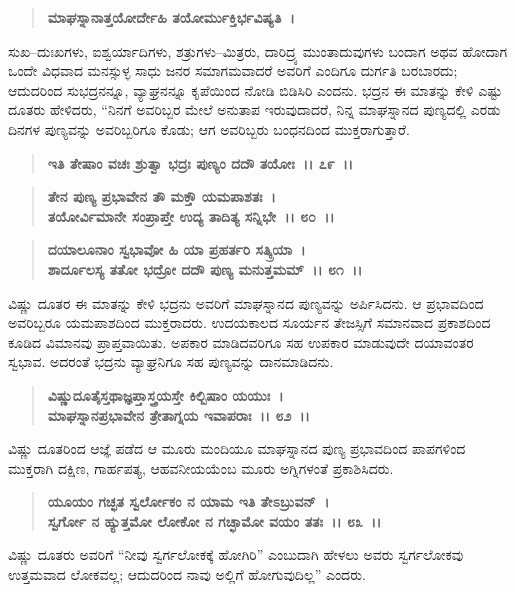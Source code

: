 \begin{verse}
\textbf{ಮಾಘಸ್ನಾನಾತ್ತಯೋರ್ದೇಹಿ ತಯೋರ್ಮುಕ್ತಿರ್ಭವಿಷ್ಯತಿ~।}
\end{verse}

ಸುಖ–ದುಃಖಗಳು, ಐಶ್ವರ್ಯಾದಿಗಳು, ಶತ್ರುಗಳು–ಮಿತ್ರರು, ದಾರಿದ್ರ್ಯ ಮುಂತಾದುವುಗಳು ಬಂದಾಗ ಅಥವ ಹೋದಾಗ ಒಂದೇ ವಿಧವಾದ ಮನಸ್ಸುಳ್ಳ ಸಾಧು ಜನರ ಸಮಾಗಮವಾದರೆ ಅವರಿಗೆ ಎಂದಿಗೂ ದುರ್ಗತಿ ಬರಬಾರದು; ಆದುದರಿಂದ ಸುಭದ್ರನನ್ನೂ, ವ್ಯಾಘ್ರನನ್ನೂ ಕೃಪೆಯಿಂದ ನೋಡಿ ಬಿಡಿಸಿರಿ ಎಂದನು. ಭದ್ರನ ಈ ಮಾತನ್ನು ಕೇಳಿ ಎಷ್ಟು ದೂತರು ಹೇಳಿದರು, “ನಿನಗೆ ಅವರಿಬ್ಬರ ಮೇಲೆ ಅನುತಾಪ ಇರುವುದಾದರೆ, ನಿನ್ನ ಮಾಘ\break ಸ್ನಾನದ ಪುಣ್ಯದಲ್ಲಿ ಎರಡು ದಿನಗಳ ಪುಣ್ಯವನ್ನು ಅವರಿಬ್ಬರಿಗೂ ಕೊಡು; ಆಗ ಅವರಿಬ್ಬರು ಬಂಧನದಿಂದ ಮುಕ್ತರಾಗುತ್ತಾರೆ.

\begin{verse}
\textbf{ಇತಿ ತೇಷಾಂ ವಚಃ ಶ್ರುತ್ವಾ ಭದ್ರಃ ಪುಣ್ಯಂ ದದೌ ತಯೋಃ~।। ೭೯~।।} 
\end{verse}

\begin{verse}
\textbf{ತೇನ ಪುಣ್ಯ ಪ್ರಭಾವೇನ ತೌ ಮಕ್ತೌ ಯಮಪಾಶತಃ~।}\\\textbf{ತಯೋರ್ವಿಮಾನೇ ಸಂಪ್ರಾಪ್ತೇ ಉದ್ಯ ತಾದಿತ್ಯ ಸನ್ನಿಭೇ~।। ೮೦~।। }
\end{verse}

\begin{verse}
\textbf{ದಯಾಲೂನಾಂ ಸ್ವಭಾವೋ ಹಿ ಯಾ ಪ್ರಹರ್ತರಿ ಸತ್ಕ್ರಿಯಾ~।}\\\textbf{ಶಾರ್ದೂಲಸ್ಯ ತತೋ ಭದ್ರೋ ದದೌ ಪುಣ್ಯ ಮನುತ್ತಮಮ್~।। ೮೧~।।}
\end{verse}

ವಿಷ್ಣು ದೂತರ ಈ ಮಾತನ್ನು ಕೇಳಿ ಭದ್ರನು ಅವರಿಗೆ ಮಾಘಸ್ನಾನದ ಪುಣ್ಯವನ್ನು ಅರ್ಪಿಸಿದನು. ಆ ಪ್ರಭಾವದಿಂದ ಅವರಿಬ್ಬರೂ ಯಮಪಾಶದಿಂದ ಮುಕ್ತರಾದರು. ಉದಯಕಾಲದ ಸೂರ್ಯನ ತೇಜಸ್ಸಿಗೆ ಸಮಾನವಾದ ಪ್ರಕಾಶದಿಂದ ಕೂಡಿದ ವಿಮಾನವು ಪ್ರಾಪ್ತವಾಯಿತು. ಅಪಕಾರ ಮಾಡಿದವರಿಗೂ ಸಹ ಉಪಕಾರ ಮಾಡುವುದೇ ದಯಾವಂತರ ಸ್ವಭಾವ. ಅದರಂತೆ ಭದ್ರನು ವ್ಯಾಘ್ರನಿಗೂ ಸಹ ಪುಣ್ಯವನ್ನು ದಾನಮಾಡಿದನು.

\begin{verse}
\textbf{ವಿಷ್ಣುದೂತೈಸ್ತಥಾಜ್ಞಪ್ತಾಸ್ತ್ರಯಸ್ತೇ ಕಿಲ್ಬಿಷಾಂ ಯಯುಃ~।}\\\textbf{ಮಾಘಸ್ನಾನಪ್ರಭಾವೇನ ತ್ರೇತಾಗ್ನಯ ಇವಾಪರಾಃ~।। ೮೨~।।}
\end{verse}

ವಿಷ್ಣು ದೂತರಿಂದ ಆಜ್ಞೆ ಪಡೆದ ಆ ಮೂರು ಮಂದಿಯೂ ಮಾಘಸ್ನಾನದ ಪುಣ್ಯ ಪ್ರಭಾವದಿಂದ ಪಾಪಗಳಿಂದ ಮುಕ್ತರಾಗಿ ದಕ್ಷಿಣ, ಗಾರ್ಹಪತ್ಯ, ಆಹವನೀಯಯೆಂಬ ಮೂರು ಅಗ್ನಿಗಳಂತೆ ಪ್ರಕಾಶಿಸಿದರು.

\begin{verse}
\textbf{ಯೂಯಂ ಗಚ್ಛತ ಸ್ವರ್ಲೋಕಂ ನ ಯಾಮ ಇತಿ ತೇಽಬ್ರುವನ್~।}\\\textbf{ಸ್ವರ್ಗೋ ನ ಹ್ಯುತ್ತಮೋ ಲೋಕೋ ನ ಗಚ್ಛಾಮೋ ವಯಂ ತತಃ~।। ೮೩~।।}
\end{verse}

ವಿಷ್ಣು ದೂತರು ಅವರಿಗೆ “ನೀವು ಸ್ವರ್ಗಲೋಕಕ್ಕೆ ಹೋಗಿರಿ” ಎಂಬುದಾಗಿ ಹೇಳಲು ಅವರು ಸ್ವರ್ಗಲೋಕವು ಉತ್ತಮವಾದ ಲೋಕವಲ್ಲ; ಆದುದರಿಂದ ನಾವು ಅಲ್ಲಿಗೆ ಹೋಗುವುದಿಲ್ಲ” ಎಂದರು.

